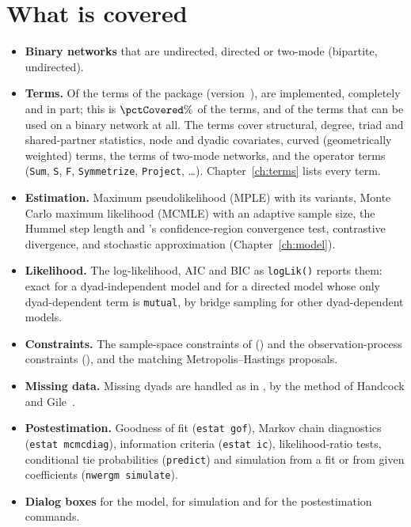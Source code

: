 \section{What is covered}

\begin{itemize}[nosep]
  \item \textbf{Binary networks} that are undirected, directed or two-mode (bipartite, undirected).
  \item \textbf{Terms.} Of the \nErgm{} terms of the package \ergm{} (version~\ergmver{}), \nCovered{} are implemented, \nImpl{} completely and \nPartial{} in part; this is $\pctCovered\%$ of the terms, and \nCovered{} of the \nBinary{} terms that can be used on a binary network at all. The terms cover structural, degree, triad and shared-partner statistics, node and dyadic covariates, curved (geometrically weighted) terms, the terms of two-mode networks, and the operator terms (\texttt{Sum}, \texttt{S}, \texttt{F}, \texttt{Symmetrize}, \texttt{Project}, \ldots). Chapter~\ref{ch:terms} lists every term.
  \item \textbf{Estimation.} Maximum pseudolikelihood (MPLE) with its variants, Monte Carlo maximum likelihood (MCMLE) with an adaptive sample size, the Hummel step length and \ergm{}'s confidence-region convergence test, contrastive divergence, and stochastic approximation (Chapter~\ref{ch:model}).
  \item \textbf{Likelihood.} The log-likelihood, AIC and BIC as \texttt{logLik()} reports them: exact for a dyad-independent model and for a directed model whose only dyad-dependent term is \texttt{mutual}, by bridge sampling for other dyad-dependent models.
  \item \textbf{Constraints.} The sample-space constraints of \ergm{} () and the observation-process constraints (), and the matching Metropolis--Hastings proposals.
  \item \textbf{Missing data.} Missing dyads are handled as in \ergm{}, by the method of Handcock and Gile~\cite{handcock2010}.
  \item \textbf{Postestimation.} Goodness of fit (\texttt{estat gof}), Markov chain diagnostics (\texttt{estat mcmcdiag}), information criteria (\texttt{estat ic}), likelihood-ratio tests, conditional tie probabilities (\texttt{predict}) and simulation from a fit or from given coefficients (\texttt{nwergm simulate}).
  \item \textbf{Dialog boxes} for the model, for simulation and for the postestimation commands.
\end{itemize}

